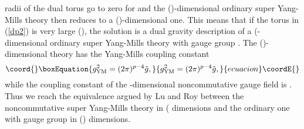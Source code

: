 \documentclass[a4paper,12pt]{article}
\begin{document}
radii of the dual torus go to zero for \coordHE{} and the
(\coordHE{})-dimensional ordinary super Yang-Mills theory then reduces to a
(\coordHE{})-dimensional one. This means that if the torus in (\ref{dp2}) is
very large (\coordHE{}), the solution is a dual
gravity description of a (\coordHE{}-dimensional ordinary super Yang-Mills
theory with gauge group \coordHE{}. The (\coordHE{})-dimensional theory has the
Yang-Mills coupling constant
\begin{equation}\coord{}\boxEquation{
\label{const1}
g^2_{\rm YM}=(2\pi)^{p-4}\tilde{g},
}{
g^2_{\rm YM}=(2\pi)^{p-4}\tilde{g},
}{ecuacion}\coordE{}\end{equation}
while the coupling constant of the \coordHE{}-dimensional noncommutative gauge
field is \coordHE{}. Thus we reach the
equivalence argued by Lu and Roy \cite{Lu} between the noncommutative
super Yang-Mills theory in (\coordHE{} dimensions and the ordinary one
with gauge group \coordHE{} in (\coordHE{}) dimensions.
\end{document}
